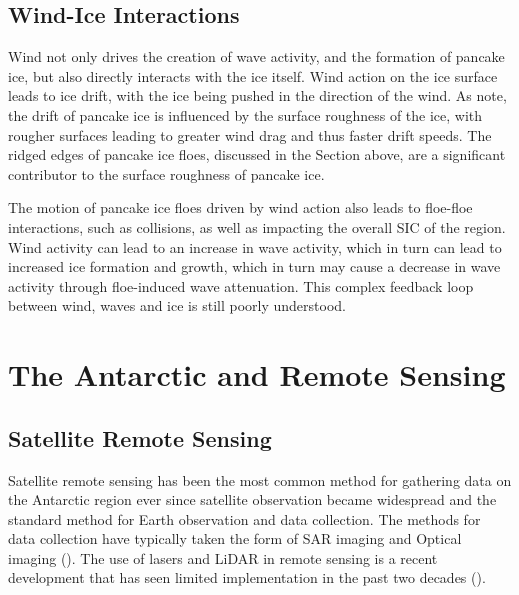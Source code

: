 \subsection{Wind-Ice Interactions}
\label{subsec:ch2.section3.subsec2}

Wind not only drives the creation of wave activity, and the formation of pancake ice, but also directly interacts with the ice itself. Wind action on the ice surface leads to ice drift, with the ice being pushed in the direction of the wind. As \textcite{alberelloDriftPancakeIce2020} note, the drift of pancake ice is influenced by the surface roughness of the ice, with rougher surfaces leading to greater wind drag and thus faster drift speeds. The ridged edges of pancake ice floes, discussed in the Section above, are a significant contributor to the surface roughness of pancake ice.

The motion of pancake ice floes driven by wind action also leads to floe-floe interactions, such as collisions, as well as impacting the overall \ac{SIC} of the region. Wind activity can lead to an increase in wave activity, which in turn can lead to increased ice formation and growth, which in turn may cause a decrease in wave activity through floe-induced wave attenuation. This complex feedback loop between wind, waves and ice is still poorly understood.

\section{The Antarctic and Remote Sensing}
\label{sec:ch2.section4}

\subsection{Satellite Remote Sensing}
\label{subsec:ch2.section4.subsec1}

Satellite remote sensing has been the most common method for gathering data on the Antarctic region ever since satellite observation became widespread and the standard method for Earth observation and data collection. The methods for data collection have typically taken the form of \ac{SAR} imaging and Optical imaging (\cite{maslanikRemoteSensingAntarctica1990}). The use of lasers and \ac{LiDAR} in remote sensing is a recent development that has seen limited implementation in the past two decades (\cite{pettorelliSatelliteRemoteSensing2014}).

